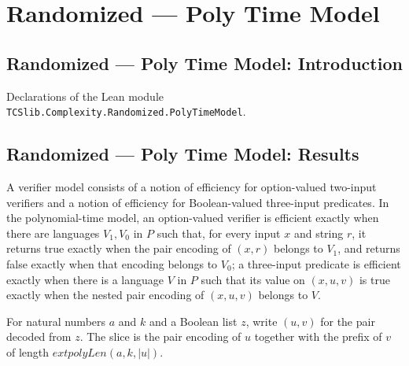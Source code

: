 \section{Randomized --- Poly Time Model}
\subsection*{Randomized --- Poly Time Model: Introduction}

Declarations of the Lean module \texttt{TCSlib.Complexity.Randomized.PolyTimeModel}.

\subsection*{Randomized --- Poly Time Model: Results}

\begin{definition}
\label{Randomized.polyTimeModel}
\leanok
{}
A verifier model consists of a notion of efficiency for option-valued two-input
verifiers and a notion of efficiency for Boolean-valued three-input predicates. In the
polynomial-time model, an option-valued verifier is efficient exactly when there are
languages $V_1,V_0$ in $P$ such that, for every input $x$ and string $r$, it returns
true exactly when the pair encoding of $(x,r)$ belongs to $V_1$, and returns false
exactly when that encoding belongs to $V_0$; a three-input predicate is efficient
exactly when there is a language $V$ in $P$ such that its value on $(x,u,v)$ is true
exactly when the nested pair encoding of $(x,u,v)$ belongs to $V$.
\end{definition}

\begin{definition}
\label{Randomized.sliceTake}
\leanok
{}
For natural numbers $a$ and $k$ and a Boolean list $z$, write $(u,v)$ for the pair
decoded from $z$. The slice is the pair encoding of $u$ together with the prefix of $v$
of length $	ext{polyLen}(a,k,|u|)$.
\end{definition}

